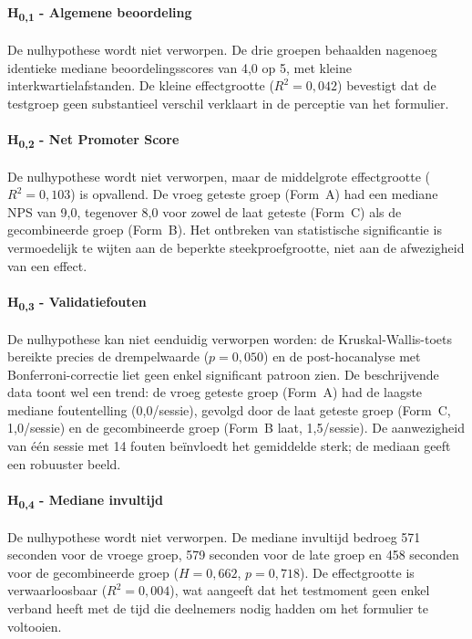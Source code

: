\section{}

\paragraph{H\textsubscript{0,1} - Algemene beoordeling}
De nulhypothese wordt niet verworpen. De drie groepen behaalden nagenoeg identieke mediane beoordelingsscores van 4,0 op 5, met kleine interkwartielafstanden. De kleine effectgrootte ($R^2 = 0{,}042$) bevestigt dat de testgroep geen substantieel verschil verklaart in de perceptie van het formulier.

\paragraph{H\textsubscript{0,2} - Net Promoter Score}
De nulhypothese wordt niet verworpen, maar de middelgrote effectgrootte ($R^2 = 0{,}103$) is opvallend. De vroeg geteste groep (Form~A) had een mediane NPS van 9,0, tegenover 8,0 voor zowel de laat geteste (Form~C) als de gecombineerde groep (Form~B). Het ontbreken van statistische significantie is vermoedelijk te wijten aan de beperkte steekproefgrootte, niet aan de afwezigheid van een effect.

\paragraph{H\textsubscript{0,3} - Validatiefouten}
De nulhypothese kan niet eenduidig verworpen worden: de Kruskal-Wallis-toets bereikte precies de drempelwaarde ($p = 0{,}050$) en de post-hocanalyse met Bonferroni-correctie liet geen enkel significant patroon zien. De beschrijvende data toont wel een trend: de vroeg geteste groep (Form~A) had de laagste mediane foutentelling (0,0/sessie), gevolgd door de laat geteste groep (Form~C, 1,0/sessie) en de gecombineerde groep (Form~B laat, 1,5/sessie). De aanwezigheid van één sessie met 14 fouten beïnvloedt het gemiddelde sterk; de mediaan geeft een robuuster beeld.

\paragraph{H\textsubscript{0,4} - Mediane invultijd}
De nulhypothese wordt niet verworpen. De mediane invultijd bedroeg 571 seconden voor de vroege groep, 579 seconden voor de late groep en 458 seconden voor de gecombineerde groep ($H = 0{,}662$, $p = 0{,}718$). De effectgrootte is verwaarloosbaar ($R^2 = 0{,}004$), wat aangeeft dat het testmoment geen enkel verband heeft met de tijd die deelnemers nodig hadden om het formulier te voltooien.

